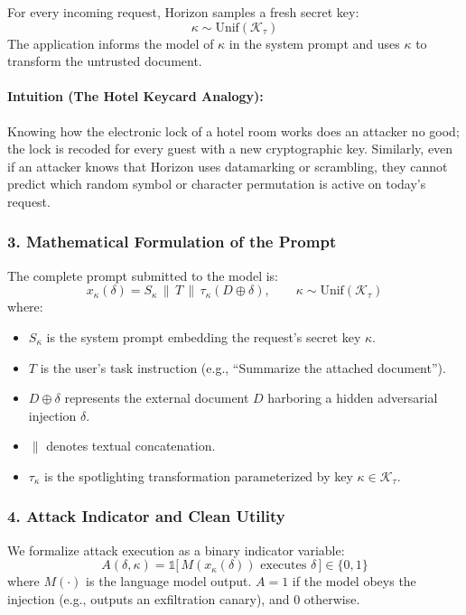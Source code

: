For every incoming request, Horizon samples a fresh secret key:
\begin{equation}
    \kappa \sim \mathrm{Unif}(\mathcal{K}_\tau)
\end{equation}
The application informs the model of $\kappa$ in the system prompt and uses $\kappa$ to transform the untrusted document. 

\paragraph{Intuition (The Hotel Keycard Analogy):} Knowing how the electronic lock of a hotel room works does an attacker no good; the lock is recoded for every guest with a new cryptographic key. Similarly, even if an attacker knows that Horizon uses datamarking or scrambling, they cannot predict which random symbol or character permutation is active on today's request.

\subsubsection{3. Mathematical Formulation of the Prompt}
The complete prompt submitted to the model is:
\begin{equation}
    x_\kappa(\delta) = S_\kappa \,\|\, T \,\|\, \tau_\kappa(D \oplus \delta), \qquad \kappa \sim \mathrm{Unif}(\mathcal{K}_\tau)
\end{equation}
where:
\begin{itemize}
    \item $S_\kappa$ is the system prompt embedding the request's secret key $\kappa$.
    \item $T$ is the user's task instruction (e.g., ``Summarize the attached document'').
    \item $D \oplus \delta$ represents the external document $D$ harboring a hidden adversarial injection $\delta$.
    \item $\|$ denotes textual concatenation.
    \item $\tau_\kappa$ is the spotlighting transformation parameterized by key $\kappa \in \mathcal{K}_\tau$.
\end{itemize}

\subsubsection{4. Attack Indicator and Clean Utility}
We formalize attack execution as a binary indicator variable:
\begin{equation}
    A(\delta, \kappa) = \mathbb{1}\big[\, M(x_\kappa(\delta)) \text{ executes } \delta \,\big] \in \{0, 1\}
\end{equation}
where $M(\cdot)$ is the language model output. $A = 1$ if the model obeys the injection (e.g., outputs an exfiltration canary), and $0$ otherwise.

